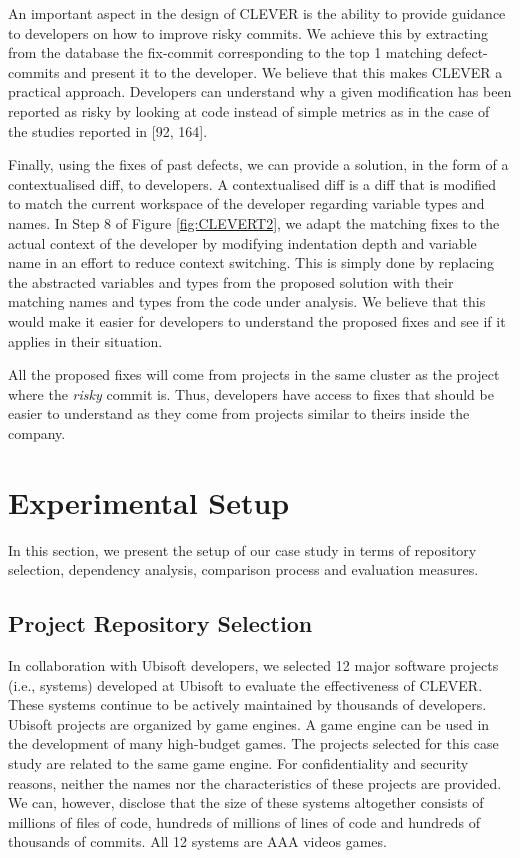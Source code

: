 \documentclass[12pt]{report}
\begin{document}
An important aspect in the design of CLEVER is the ability to provide
guidance to developers on how to improve risky commits. We achieve this
by extracting from the database the fix-commit corresponding to the top
1 matching defect-commits and present it to the developer. We believe
that this makes CLEVER a practical approach. Developers can understand
why a given modification has been reported as risky by looking at code
instead of simple metrics as in the case of the studies reported in
{[}92, 164{]}.

Finally, using the fixes of past defects, we can provide a solution, in
the form of a contextualised diff, to developers. A contextualised diff
is a diff that is modified to match the current workspace of the
developer regarding variable types and names. In Step 8 of Figure
\ref{fig:CLEVERT2}, we adapt the matching fixes to the actual context of
the developer by modifying indentation depth and variable name in an
effort to reduce context switching. This is simply done by replacing the
abstracted variables and types from the proposed solution with their
matching names and types from the code under analysis. We believe that
this would make it easier for developers to understand the proposed
fixes and see if it applies in their situation.

All the proposed fixes will come from projects in the same cluster as
the project where the \emph{risky} commit is. Thus, developers have
access to fixes that should be easier to understand as they come from
projects similar to theirs inside the company.

\section{Experimental Setup}\label{sec:exp}

In this section, we present the setup of our case study in terms of
repository selection, dependency analysis, comparison process and
evaluation measures.

\subsection{Project Repository Selection}\label{sec:rep}

In collaboration with Ubisoft developers, we selected 12 major software
projects (i.e., systems) developed at Ubisoft to evaluate the
effectiveness of CLEVER. These systems continue to be actively
maintained by thousands of developers. Ubisoft projects are organized by
game engines. A game engine can be used in the development of many
high-budget games. The projects selected for this case study are related
to the same game engine. For confidentiality and security reasons,
neither the names nor the characteristics of these projects are
provided. We can, however, disclose that the size of these systems
altogether consists of millions of files of code, hundreds of millions
of lines of code and hundreds of thousands of commits. All 12 systems
are AAA videos games.
\end{document}
